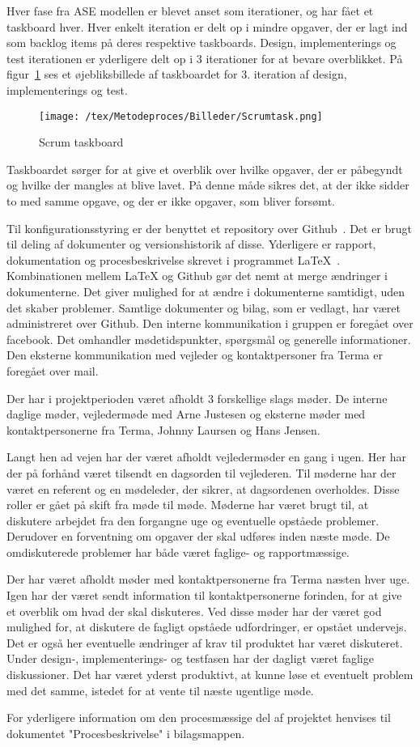 Hver fase fra ASE modellen er blevet anset som iterationer, og har fået et taskboard hver. Hver enkelt iteration er delt op i mindre opgaver, der er lagt ind som backlog items på deres respektive taskboards. Design, implementerings og test iterationen er yderligere delt op i 3 iterationer for at bevare overblikket. På figur~\ref{fig:Taskboard} ses et øjebliksbillede af taskboardet for 3. iteration af design, implementerings og test.
\begin{figure}[H]
	\center
	\texttt{[image: /tex/Metodeproces/Billeder/Scrumtask.png]}
	\caption{Scrum taskboard}
	\label{fig:Taskboard}
\end{figure}        
\noindent Taskboardet sørger for at give et overblik over hvilke opgaver, der er påbegyndt og hvilke der mangles at blive lavet. På denne måde sikres det, at der ikke sidder to med samme opgave, og der er ikke opgaver, som bliver forsømt.

Til konfigurationsstyring er der benyttet et repository over Github~\cite{Github}. Det er brugt til deling af dokumenter og versionshistorik af disse. Yderligere er rapport, dokumentation og procesbeskrivelse skrevet i programmet LaTeX~\cite{Latex}. Kombinationen mellem LaTeX og Github gør det nemt at merge ændringer i dokumenterne. Det giver mulighed for at ændre i dokumenterne samtidigt, uden det skaber problemer. Samtlige dokumenter og bilag, som er vedlagt, har været administreret over Github.
Den interne kommunikation i gruppen er foregået over facebook. Det omhandler mødetidspunkter, spørgsmål og generelle informationer. Den eksterne kommunikation med vejleder og kontaktpersoner fra Terma er foregået over mail.  

Der har i projektperioden været afholdt 3 forskellige slags møder. De interne daglige møder, vejledermøde med Arne Justesen og eksterne møder med kontaktpersonerne fra Terma, Johnny Laursen og Hans Jensen. 

Langt hen ad vejen har der været afholdt vejledermøder en gang i ugen. Her har der på forhånd været tilsendt en dagsorden til vejlederen. Til møderne har der været en referent og en mødeleder, der sikrer, at dagsordenen overholdes. Disse roller er gået på skift fra møde til møde. Møderne har været brugt til, at diskutere arbejdet fra den forgangne uge og eventuelle opståede problemer. Derudover en forventning om opgaver der skal udføres inden næste møde. De omdiskuterede problemer har både været faglige- og rapportmæssige. 

Der har været afholdt møder med kontaktpersonerne fra Terma næsten hver uge. Igen har der været sendt information til kontaktpersonerne forinden, for at give et overblik om hvad der skal diskuteres. Ved disse møder har der været god mulighed for, at diskutere de fagligt opståede udfordringer, er opstået undervejs. Det er også her eventuelle ændringer af krav til produktet har været diskuteret. Under design-, implementerings- og testfasen har der dagligt været faglige diskussioner. Det har været yderst produktivt, at kunne løse et eventuelt problem med det samme, istedet for at vente til næste ugentlige møde. 

For yderligere information om den procesmæssige del af projektet henvises til dokumentet "Procesbeskrivelse" i bilagsmappen.  